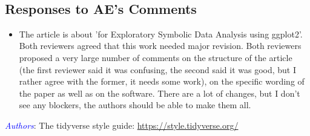 \documentclass[11pt]{article}
\newcommand{\authors}[1]{

 \parbox{15cm}{\textcolor{blue}{\it Authors}: \color{red}#1}
 \\ \vspace{0.3cm}
}
\begin{document}
 \\

\subsection*{Responses to AE's Comments}
\vspace{0.5cm}


\begin{itemize}
\item
The article is about 'for Exploratory Symbolic Data Analysis using ggplot2'. Both reviewers agreed that this work needed major revision. Both reviewers proposed a very large number of comments on the structure of the article (the first reviewer said it was confusing, the second said it was good, but I rather agree with the former, it needs some work), on the specific wording of the paper as well as on the software. There are a lot of changes, but I don't see any blockers, the authors should be able to make them all.
\end{itemize}
\authors{The tidyverse style guide: \url{https://style.tidyverse.org/}}





\clearpage{} 

 \\
\end{document}
